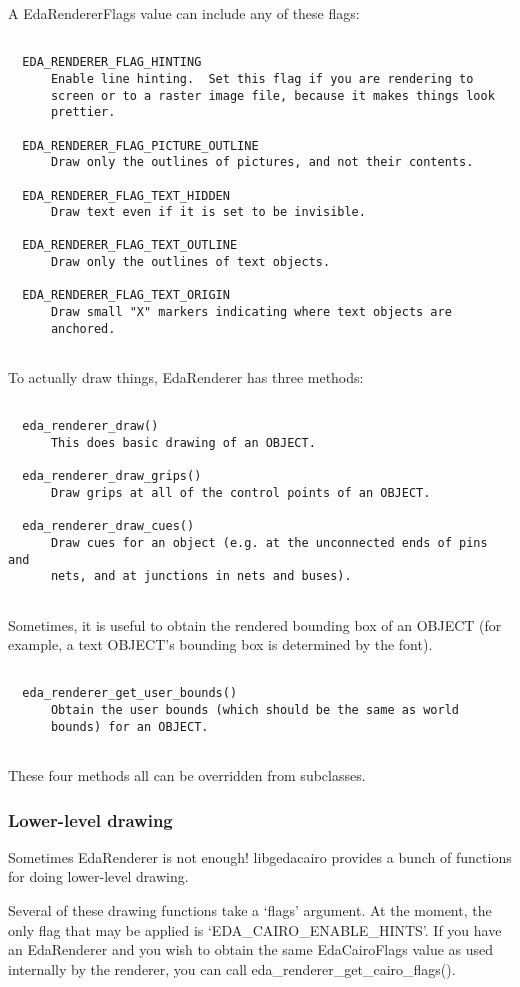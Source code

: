  A EdaRendererFlags value can include any of these flags: \begin{verbatim}
	
  EDA_RENDERER_FLAG_HINTING
      Enable line hinting.  Set this flag if you are rendering to
      screen or to a raster image file, because it makes things look
      prettier.

  EDA_RENDERER_FLAG_PICTURE_OUTLINE
      Draw only the outlines of pictures, and not their contents.

  EDA_RENDERER_FLAG_TEXT_HIDDEN
      Draw text even if it is set to be invisible.

  EDA_RENDERER_FLAG_TEXT_OUTLINE
      Draw only the outlines of text objects.

  EDA_RENDERER_FLAG_TEXT_ORIGIN
      Draw small "X" markers indicating where text objects are
      anchored.
  
\end{verbatim}
 To actually draw things, EdaRenderer has three methods: \begin{verbatim}
	
  eda_renderer_draw()
      This does basic drawing of an OBJECT.

  eda_renderer_draw_grips()
      Draw grips at all of the control points of an OBJECT.

  eda_renderer_draw_cues()
      Draw cues for an object (e.g. at the unconnected ends of pins and
      nets, and at junctions in nets and buses).
  
\end{verbatim}
 Sometimes, it is useful to obtain the rendered bounding box of an OBJECT (for example, a text OBJECT's bounding box is determined by the font). \begin{verbatim}
	
  eda_renderer_get_user_bounds()
      Obtain the user bounds (which should be the same as world
      bounds) for an OBJECT.
  
\end{verbatim}
 These four methods all can be overridden from subclasses. 
\subsubsection*{Lower-level drawing}
 Sometimes EdaRenderer is not enough! libgedacairo provides a bunch of functions for doing lower-level drawing. 

  Several of these drawing functions take a `flags' argument. At the moment, the only flag that may be applied is `EDA\_CAIRO\_ENABLE\_HINTS'. If you have an EdaRenderer and you wish to obtain the same EdaCairoFlags value as used internally by the renderer, you can call eda\_renderer\_get\_cairo\_flags(). 


